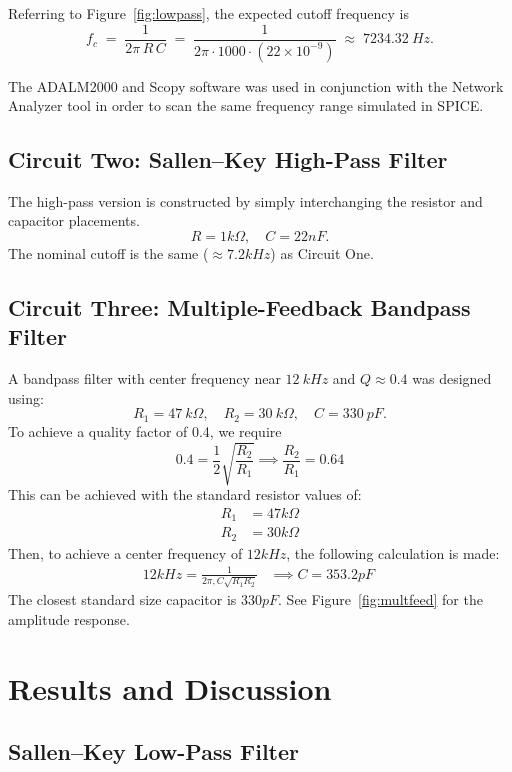 \documentclass[12pt]{article}
\begin{document}
Referring to Figure~\ref{fig:lowpass}, the expected cutoff frequency is
\begin{equation*}
	f_c \;=\;
	\frac{1}{2\pi\,R\,C}
	\;=\;
	\frac{1}{2\pi \cdot 1000 \cdot (22\times10^{-9})}
	\;\approx\;
	\SI{7234.32}{Hz}.
\end{equation*}

The ADALM2000 and Scopy software was used in conjunction with the Network
Analyzer tool in order to scan the same frequency range simulated in SPICE.
\subsection{Circuit Two: Sallen--Key High-Pass Filter}
The high-pass version is constructed by simply interchanging the resistor and
capacitor placements.
\[
	R = 1k\Omega, \quad C = 22nF.
\]
The nominal cutoff is the same ($\approx7.2kHz$) as Circuit One.

\subsection{Circuit Three: Multiple-Feedback Bandpass Filter}
A bandpass filter with center frequency near $\SI{12}{kHz}$ and $Q\approx 0.4$
was designed using:
\begin{equation*}
	R_1 = \SI{47}{k\Omega},
	\quad
	R_2 = \SI{30}{k\Omega},
	\quad
	C   = \SI{330}{pF}.
\end{equation*}
To achieve a quality factor of 0.4, we require
\[
	0.4 = \frac{1}{2}\sqrt{\frac{R_2}{R_1}} \implies \frac{R_2}{R_1} = 0.64
\]
This can be achieved with the standard resistor values of:
\begin{align*}
	R_1 & = 47k\Omega \\
	R_2 & = 30k\Omega
\end{align*}
Then, to achieve a center frequency of $12kHz$, the following calculation is made:
\begin{align*}
	12kHz = \frac{1}{2\pi,C\sqrt{R_1R_2}} & \implies C = 353.2pF\
\end{align*}
The closest standard size capacitor is $330pF$. See Figure~\ref{fig:multfeed} for the amplitude response.

\section{Results and Discussion}

\subsection{Sallen--Key Low-Pass Filter}
\end{document}
